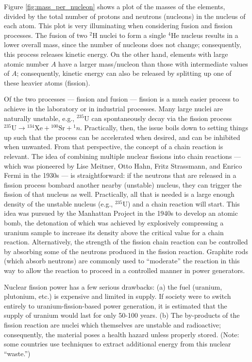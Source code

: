 Figure \ref{fig:mass_per_nucleon} shows a plot of the masses of the
elements, divided by the total number of protons and neutrons
(nucleons) in the nucleus of each atom.  This plot is very
illuminating when considering fusion and fission processes.  
The
fusion of two $^2$H nuclei to form a single $^4$He nucleus results in
a lower overall mass, since the number of nucleons does not change; 
consequently, this process releases kinetic
energy.  On the other hand, elements with large atomic number $A$
have a larger mass/nucleon than those with intermediate values of $A$;
consequently, kinetic energy can also be released by splitting up one of
these heavier atoms (fission).

Of the two processes --- fission and fusion --- fission is a much
easier process to achieve in the laboratory or in industrial
processes.  Many large nuclei are naturally unstable, e.g., $^{235}$U can
spontaneously decay via the fission process ${}^{235}\text{U} \rightarrow
{}^{134}\text{Xe} + {}^{100}\text{Sr} + {}^1n$.  Practically, then, the
issue boils down to setting things up such that the process can be
accelerated when desired, and can be inhibited when unwanted.  From
that perspective, the concept of a chain reaction is relevant.  The
idea of combining multiple nuclear fissions into chain reactions ---which was pioneered
by Lise Meitner, Otto Hahn, Fritz Strassmann, and Enrico Fermi in the
1930s --- is straightforward: if the neutrons that are released in a
fission process bombard another nearby (unstable) nucleus, they can
trigger the fission of that nucleus as well.  Practically, all that is
needed is a large enough density of the unstable nucleus (e.g., $^{235}$U)
 and a chain
reaction will start.  This idea was pursued by the Manhattan Project
in the 1940s to develop an atomic bomb, the detonation of which was
achieved by explosively compressing a uranium sample to increase its
density above the critical value for a chain reaction.  Alternatively,
the strength of the fission chain reaction 
can be controlled by absorbing some of the neutrons
produced in the fission reaction. Graphite  rods
(which absorb neutrons) are commonly used to ``moderate''
the reaction in this way to allow the reaction to proceed in a
controlled manner in power generators.

Nuclear fission power has a few serious drawbacks: (a) the fuel (uranium,
plutonium, etc.) is
expensive and limited in supply.  If society were to switch entirely
to uranium-fission-based power generation, it is estimated that the supply
of uranium would last for only 50-100 years.  (b) The by-products of
the fission reaction are nuclei which themselves are unstable and
radioactive; consequently, the material poses a health hazard unless
properly stored.  (Note: some countries use  techniques to
extract additional energy from this nuclear ``waste.'')
     
